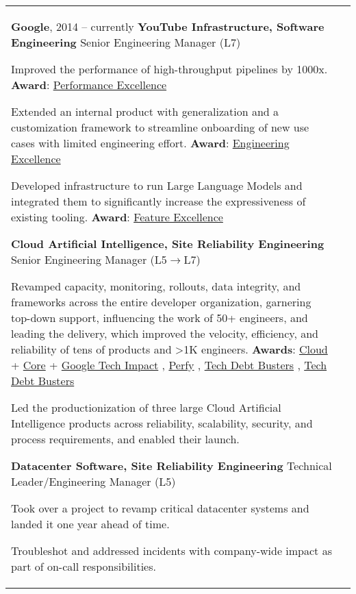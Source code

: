 \documentclass[letterpaper,10pt,oneside]{article}
\newcommand{\DatestampY}[1]{#1}
\newcommand{\itemspacing}{\vspace{0.12cm}}
\newcommand{\sref}[2]{%
    \href{https://0/local/attachments/#1}{\textcolor{hiddenblue}{#2}}%
}
\newenvironment{body}
{\par\par
\begin{longtable}{p{0.145\textwidth}p{0.81\textwidth}}}
{\par\end{longtable}\par}
\begin{document}
\begin{body}
\textbf{Google}, \DatestampY{2014} -- currently \vspace{0.06cm} \newline
\phantom{g}\textbf{YouTube Infrastructure, Software Engineering} \textemdash{ }Senior Engineering Manager (L7)
\begin{comp}
\item Improved the performance of high-throughput pipelines by 1000x. \textbf{Award}: \sref{Google-Award-PerformanceExcellence.pdf}{Performance Excellence}
\item Extended an internal product with generalization and a customization framework to streamline onboarding of new use cases with limited engineering effort. \textbf{Award}: \sref{Award-EngineeringExcellenceImpact.pdf}{Engineering Excellence}
\item Developed infrastructure to run Large Language Models and integrated them to significantly increase the expressiveness of existing tooling. \textbf{Award}: \sref{Google-Award-FeatureExcellence.pdf}{Feature Excellence}
\end{comp}
\itemspacing

\phantom{g}\textbf{Cloud Artificial Intelligence, Site Reliability Engineering} \textemdash{ }Senior Engineering Manager (L5$\rightarrow$L7)
\begin{comp}
\item Revamped capacity, monitoring, rollouts, data integrity, and frameworks across the entire developer organization, garnering top-down support, influencing the work of 50+ engineers, and leading the delivery, which improved the velocity, efficiency, and reliability of tens of products and >1K engineers. \textbf{Awards}: \sref{Google-Award-GoogleCloudTechImpact-2022.pdf}{Cloud} + \sref{Google-Award-CoreTechImpact-2021.pdf}{Core} + \sref{Google-Award-GoogleTechImpact-2022.pdf}{Google Tech Impact}, \sref{Google-Award-Perfy.pdf}{Perfy}, \sref{Google-Award-TechDebtBusters1.pdf}{Tech Debt Busters}, \sref{Google-Award-TechDebtBusters2.pdf}{Tech Debt Busters}
\item Led the productionization of three large Cloud Artificial Intelligence products across reliability, scalability, security, and process requirements, and enabled their launch.
\end{comp}
\itemspacing

\phantom{g}\textbf{Datacenter Software, Site Reliability Engineering} \textemdash{ }Technical Leader/Engineering Manager (L5)
\begin{comp}
\item Took over a project to revamp critical datacenter systems and landed it one year ahead of time.
\item Troubleshot and addressed incidents with company-wide impact as part of on-call responsibilities.
\end{comp}
\itemspacing


\end{body}
\end{document}
